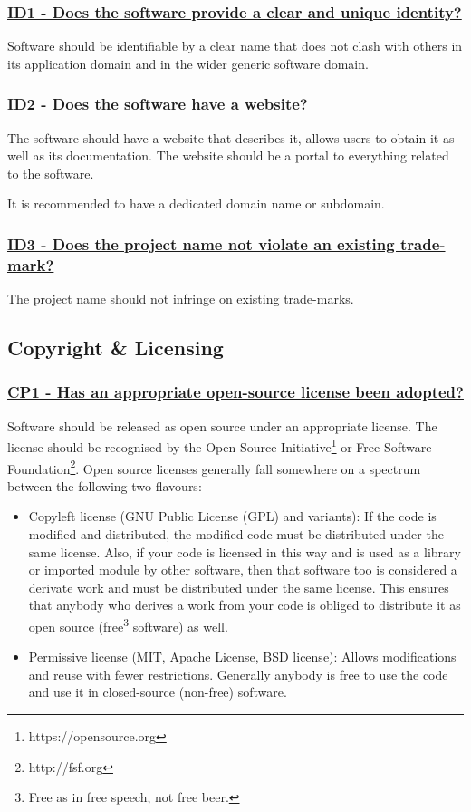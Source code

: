 \documentclass[a4paper,11pt]{article}
\newcommand{\criterion}[2]{\subsubsection*{\underline{#1 - #2}}\label{id:#1}}
\newcommand\CheckTable{%
  \begin{tabular}{ccccc}
    No & Minimal & Adequate & Good & Perfect \\
    0 & 1 & 2 & 3 & 4 \\
    \hline
    $\square$ & $\square$ & $\square$ & $\square$ & $\square$ \\
  \end{tabular}%
}
\begin{document}
\newcommand{\idOneID}{ID1}
\newcommand{\idOneText}{Does the software provide a clear and unique identity?}
\criterion{\idOneID}{\idOneText}

Software should be identifiable by a clear name that does not clash with others
in its application domain and in the wider generic software domain. 


\newcommand{\idTwoID}{ID2}
\newcommand{\idTwoText}{Does the software have a website?}
\criterion{\idTwoID}{\idTwoText}

The software should have a website that describes it, allows users to obtain
it as well as its documentation. The website should be a portal to everything
related to the software.

It is recommended to have a dedicated domain name or subdomain.


\newcommand{\idThreeID}{ID3}
\newcommand{\idThreeText}{Does the project name not violate an existing trade-mark?}
\criterion{\idThreeID}{\idThreeText}

The project name should not infringe on existing trade-marks.


\subsection{Copyright \& Licensing}\label{sec:cop}

\newcommand{\cpOneID}{CP1}
\newcommand{\cpOneText}{Has an appropriate open-source license been adopted?}
\criterion{\cpOneID}{\cpOneText}

Software should be released as open source under an appropriate license. The
license should be recognised by the Open Source Initiative\footnote{https://opensource.org} or Free Software
Foundation\footnote{http://fsf.org}. Open source licenses generally fall somewhere on a spectrum between the following two flavours:

\begin{itemize}
 \item Copyleft license (GNU Public License (GPL) and variants): If the code is modified and distributed, the modified code must be distributed under the same license. Also, if your code is licensed in this way and is used as a library or imported module by other software, then that software too is considered a derivate work and must be distributed under the same license. This ensures that anybody who derives a work from your code is obliged to distribute it as open source (free\footnote{Free as in free speech, not free beer.} software) as well.
 \item Permissive license (MIT, Apache License, BSD license): Allows modifications and reuse with fewer restrictions. Generally anybody is free to use the code and use it in closed-source (non-free) software.
\end{itemize}
\end{document}

